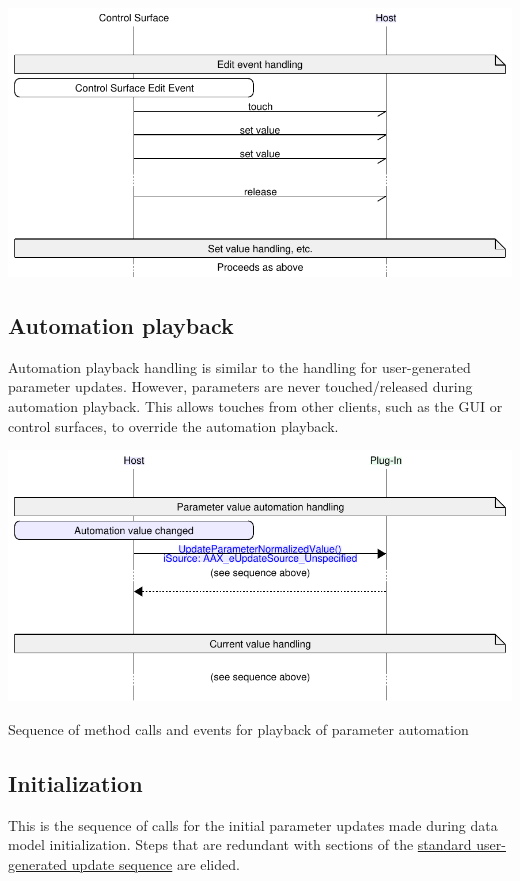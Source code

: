 \begin{DoxyImageNoCaption}
  \mbox{\includegraphics[width=\textwidth,height=\textheight/2,keepaspectratio=true]{inline_mscgraph_1}}
\end{DoxyImageNoCaption}
\hypertarget{a00353_parameterUpdates_sequences_automation}{}\subsection{Automation playback}\label{a00353_parameterUpdates_sequences_automation}
Automation playback handling is similar to the handling for user-\/generated parameter updates. However, parameters are never touched/released during automation playback. This allows touches from other clients, such as the G\+U\+I or control surfaces, to override the automation playback.


\begin{DoxyImage}
\includegraphics[width=\textwidth,height=\textheight/2,keepaspectratio=true]{msc_AAX_ParameterUpdate_Automation}
\caption{Sequence of method calls and events for playback of parameter automation}
\end{DoxyImage}
 \hypertarget{a00353_parameterUpdates_sequences_initialization}{}\subsection{Initialization}\label{a00353_parameterUpdates_sequences_initialization}
This is the sequence of calls for the initial parameter updates made during data model initialization. Steps that are redundant with sections of the \hyperlink{a00353_parameterUpdates_sequences_user_details}{standard user-\/generated update sequence} are elided.

